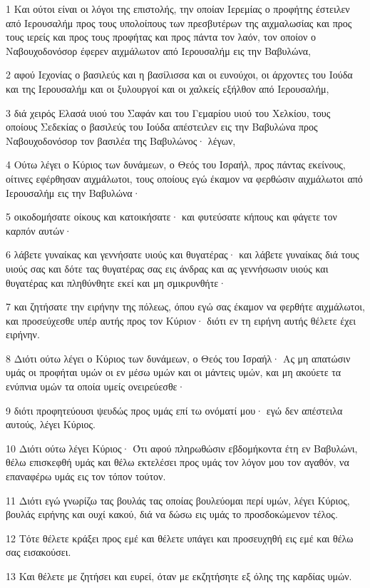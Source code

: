 \par 1 Και ούτοι είναι οι λόγοι της επιστολής, την οποίαν Ιερεμίας ο προφήτης έστειλεν από Ιερουσαλήμ προς τους υπολοίπους των πρεσβυτέρων της αιχμαλωσίας και προς τους ιερείς και προς τους προφήτας και προς πάντα τον λαόν, τον οποίον ο Ναβουχοδονόσορ έφερεν αιχμάλωτον από Ιερουσαλήμ εις την Βαβυλώνα,
\par 2 αφού Ιεχονίας ο βασιλεύς και η βασίλισσα και οι ευνούχοι, οι άρχοντες του Ιούδα και της Ιερουσαλήμ και οι ξυλουργοί και οι χαλκείς εξήλθον από Ιερουσαλήμ,
\par 3 διά χειρός Ελασά υιού του Σαφάν και του Γεμαρίου υιού του Χελκίου, τους οποίους Σεδεκίας ο βασιλεύς του Ιούδα απέστειλεν εις την Βαβυλώνα προς Ναβουχοδονόσορ τον βασιλέα της Βαβυλώνος· λέγων,
\par 4 Ούτω λέγει ο Κύριος των δυνάμεων, ο Θεός του Ισραήλ, προς πάντας εκείνους, οίτινες εφέρθησαν αιχμάλωτοι, τους οποίους εγώ έκαμον να φερθώσιν αιχμάλωτοι από Ιερουσαλήμ εις την Βαβυλώνα·
\par 5 οικοδομήσατε οίκους και κατοικήσατε· και φυτεύσατε κήπους και φάγετε τον καρπόν αυτών·
\par 6 λάβετε γυναίκας και γεννήσατε υιούς και θυγατέρας· και λάβετε γυναίκας διά τους υιούς σας και δότε τας θυγατέρας σας εις άνδρας και ας γεννήσωσιν υιούς και θυγατέρας και πληθύνθητε εκεί και μη σμικρυνθήτε·
\par 7 και ζητήσατε την ειρήνην της πόλεως, όπου εγώ σας έκαμον να φερθήτε αιχμάλωτοι, και προσεύχεσθε υπέρ αυτής προς τον Κύριον· διότι εν τη ειρήνη αυτής θέλετε έχει ειρήνην.
\par 8 Διότι ούτω λέγει ο Κύριος των δυνάμεων, ο Θεός του Ισραήλ· Ας μη απατώσιν υμάς οι προφήται υμών οι εν μέσω υμών και οι μάντεις υμών, και μη ακούετε τα ενύπνια υμών τα οποία υμείς ονειρεύεσθε·
\par 9 διότι προφητεύουσι ψευδώς προς υμάς επί τω ονόματί μου· εγώ δεν απέστειλα αυτούς, λέγει Κύριος.
\par 10 Διότι ούτω λέγει Κύριος· Ότι αφού πληρωθώσιν εβδομήκοντα έτη εν Βαβυλώνι, θέλω επισκεφθή υμάς και θέλω εκτελέσει προς υμάς τον λόγον μου τον αγαθόν, να επαναφέρω υμάς εις τον τόπον τούτον.
\par 11 Διότι εγώ γνωρίζω τας βουλάς τας οποίας βουλεύομαι περί υμών, λέγει Κύριος, βουλάς ειρήνης και ουχί κακού, διά να δώσω εις υμάς το προσδοκώμενον τέλος.
\par 12 Τότε θέλετε κράξει προς εμέ και θέλετε υπάγει και προσευχηθή εις εμέ και θέλω σας εισακούσει.
\par 13 Και θέλετε με ζητήσει και ευρεί, όταν με εκζητήσητε εξ όλης της καρδίας υμών.

